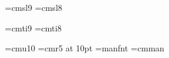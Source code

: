 \font\ninesl=cmsl9
\font\eightsl=cmsl8

\font\nineit=cmti9
\font\eightit=cmti8

\font\tenu=cmu10 %
\font\magnifiedfiverm=cmr5 at 10pt
\font\manual=manfnt %
\font\cmman=cmman %

\newskip\ttglue
\def\tenpoint{\def\rm{\fam0\tenrm}%
  \textfont0=\tenrm \scriptfont0=\sevenrm \scriptscriptfont0=\fiverm
  \textfont1=\teni \scriptfont1=\seveni \scriptscriptfont1=\fivei
  \textfont2=\tensy \scriptfont2=\sevensy \scriptscriptfont2=\fivesy
  \textfont3=\tenex \scriptfont3=\tenex \scriptscriptfont3=\tenex
  \def\it{\fam\itfam\tenit}%
  \textfont\itfam=\tenit
  \def\sl{\fam\slfam\tensl}%
  \textfont\slfam=\tensl
  \def\bf{\fam\bffam\tenbf}%
  \textfont\bffam=\tenbf \scriptfont\bffam=\sevenbf
   \scriptscriptfont\bffam=\fivebf
  \def\tt{\fam\ttfam\tentt}%
  \textfont\ttfam=\tentt
  \tt \ttglue=.5em plus.25em minus.15em
  \normalbaselineskip=12pt
  \def\MF{{\manual META}\-{\manual FONT}}%
  \let\sc=\eightrm
  \let\big=\tenbig
  \setbox\strutbox=\hbox{\vrule height8.5pt depth3.5pt width\z@}%
  \normalbaselines\rm}

\def\ninepoint{\def\rm{\fam0\ninerm}%
  \textfont0=\ninerm \scriptfont0=\sixrm \scriptscriptfont0=\fiverm
  \textfont1=\ninei \scriptfont1=\sixi \scriptscriptfont1=\fivei
  \textfont2=\ninesy \scriptfont2=\sixsy \scriptscriptfont2=\fivesy
  \textfont3=\tenex \scriptfont3=\tenex \scriptscriptfont3=\tenex
  \def\it{\fam\itfam\nineit}%
  \textfont\itfam=\nineit
  \def\sl{\fam\slfam\ninesl}%
  \textfont\slfam=\ninesl
  \def\bf{\fam\bffam\ninebf}%
  \textfont\bffam=\ninebf \scriptfont\bffam=\sixbf
   \scriptscriptfont\bffam=\fivebf
  \def\tt{\fam\ttfam\ninett}%
  \textfont\ttfam=\ninett
  \tt \ttglue=.5em plus.25em minus.15em
  \normalbaselineskip=11pt
  \def\MF{{\manual hijk}\-{\manual lmnj}}%
  \let\sc=\sevenrm
  \let\big=\ninebig
  \setbox\strutbox=\hbox{\vrule height8pt depth3pt width\z@}%
  \normalbaselines\rm}

\def\ttninepoint{\def\rm{\fam0\ninerm}%
  \textfont0=\ninerm \scriptfont0=\sixrm \scriptscriptfont0=\fiverm
  \textfont1=\ninei \scriptfont1=\sixi \scriptscriptfont1=\fivei
  \textfont2=\ninesy \scriptfont2=\sixsy \scriptscriptfont2=\fivesy
  \textfont3=\tenex \scriptfont3=\tenex \scriptscriptfont3=\tenex
  \def\it{\fam\itfam\nineit}%
  \textfont\itfam=\nineit
  \def\sl{\fam\slfam\ninesl}%
  \textfont\slfam=\ninesl
  \def\bf{\fam\bffam\ninebf}%
  \textfont\bffam=\ninebf \scriptfont\bffam=\sixbf
   \scriptscriptfont\bffam=\fivebf
  \def\tt{\fam\ttfam\ninett}%
  \textfont\ttfam=\ninett
  \normalbaselineskip=11pt
  \normalbaselines\rm}

